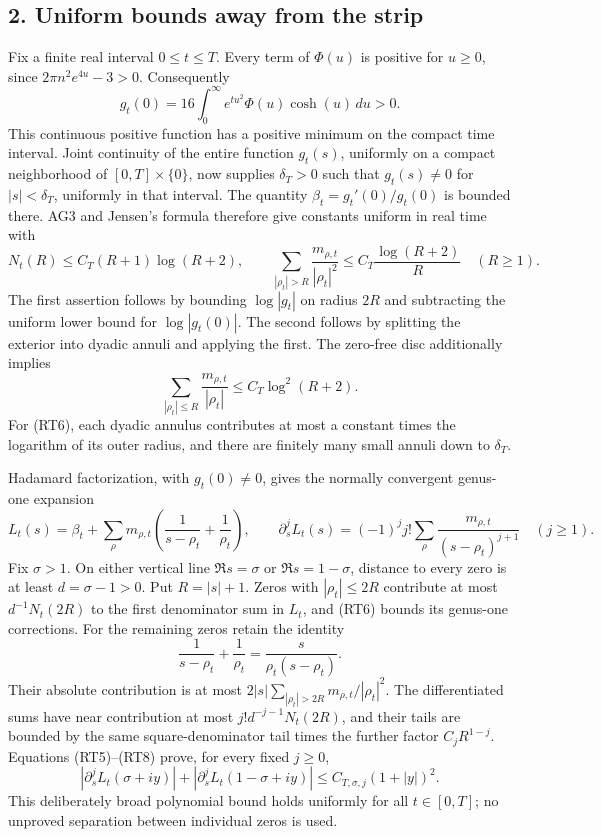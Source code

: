 \documentclass[
  10pt,
  a4paper,
]{article}
\begin{document}
\subsection{2. Uniform bounds away from the
strip}\label{uniform-bounds-away-from-the-strip}

Fix a finite real interval \(0\le t\le T\). Every term of \(\Phi(u)\) is
positive for \(u\ge0\), since \(2\pi n^2e^{4u}-3>0\). Consequently \[
g_t(0)=16\int_0^\infty e^{tu^2}\Phi(u)\cosh(u)\,du>0.
\tag{RT4}
\] This continuous positive function has a positive minimum on the
compact time interval. Joint continuity of the entire function
\(g_t(s)\), uniformly on a compact neighborhood of \([0,T]\times\{0\}\),
now supplies \(\delta_T>0\) such that \(g_t(s)\ne0\) for
\(|s|<\delta_T\), uniformly in that interval. The quantity
\(\beta_t=g_t'(0)/g_t(0)\) is bounded there. AG3 and Jensen's formula
therefore give constants uniform in real time with \[
N_t(R)\le C_T(R+1)\log(R+2),\qquad
\sum_{|\rho_t|>R}\frac{m_{\rho,t}}{|\rho_t|^2}
\le C_T\frac{\log(R+2)}R\quad(R\ge1).
\tag{RT5}
\] The first assertion follows by bounding \(\log|g_t|\) on radius
\(2R\) and subtracting the uniform lower bound for \(\log|g_t(0)|\). The
second follows by splitting the exterior into dyadic annuli and applying
the first. The zero-free disc additionally implies \[
\sum_{|\rho_t|\le R}\frac{m_{\rho,t}}{|\rho_t|}
\le C_T\log^2(R+2).
\tag{RT6}
\] For (RT6), each dyadic annulus contributes at most a constant times
the logarithm of its outer radius, and there are finitely many small
annuli down to \(\delta_T\).

Hadamard factorization, with \(g_t(0)\ne0\), gives the normally
convergent genus-one expansion \[
L_t(s)=\beta_t+\sum_\rho m_{\rho,t}
\left(\frac1{s-\rho_t}+\frac1{\rho_t}\right),\qquad
\partial_s^jL_t(s)=(-1)^j j!\sum_\rho\frac{m_{\rho,t}}{(s-\rho_t)^{j+1}}\quad(j\ge1).
\tag{RT7}
\] Fix \(\sigma>1\). On either vertical line \(\Re s=\sigma\) or
\(\Re s=1-\sigma\), distance to every zero is at least \(d=\sigma-1>0\).
Put \(R=|s|+1\). Zeros with \(|\rho_t|\le2R\) contribute at most
\(d^{-1}N_t(2R)\) to the first denominator sum in \(L_t\), and (RT6)
bounds its genus-one corrections. For the remaining zeros retain the
identity \[
\frac1{s-\rho_t}+\frac1{\rho_t}
=\frac{s}{\rho_t(s-\rho_t)}.
\tag{RT8}
\] Their absolute contribution is at most
\(2|s|\sum_{|\rho_t|>2R}m_{\rho,t}/|\rho_t|^2\). The differentiated sums
have near contribution at most \(j!d^{-j-1}N_t(2R)\), and their tails
are bounded by the same square-denominator tail times the further factor
\(C_jR^{1-j}\). Equations (RT5)--(RT8) prove, for every fixed \(j\ge0\),
\[
|\partial_s^jL_t(\sigma+iy)|+
|\partial_s^jL_t(1-\sigma+iy)|
\le C_{T,\sigma,j}(1+|y|)^2.
\tag{RT9}
\] This deliberately broad polynomial bound holds uniformly for all
\(t\in[0,T]\); no unproved separation between individual zeros is used.
\end{document}
